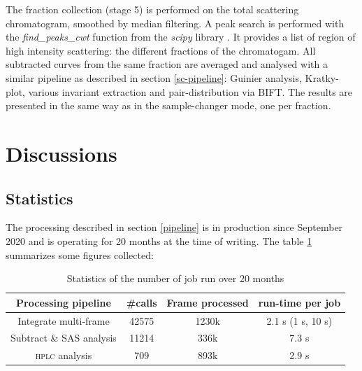 \documentclass[preprint]{iucr}              %
\begin{document}
The fraction collection (stage 5) is performed on the total scattering chromatogram, smoothed by median filtering. 
A peak search is performed with the \textit{find\_peaks\_cwt} function from the \textit{scipy} library \cite{scipy}.
It provides a list of region of high intensity scattering: the different fractions of the chromatogam.
All subtracted curves from the same fraction are averaged and analysed with a similar pipeline as described in section \ref{sc-pipeline}: Guinier analysis, Kratky-plot, various invariant extraction and pair-distribution via BIFT.
The results are presented in the same way as in the sample-changer mode, one per fraction.

\section{Discussions}

\subsection{Statistics}
The processing described in section \ref{pipeline} is in production since September 2020 and is operating for 20 months at the time of writing.
The table \ref{stats} summarizes some figures collected:
\begin{table}
    \label{stats}
    \caption{Statistics of the number of job run over 20 months}
    \begin{center}
    \begin{tabular}{|c|c|c|c|}
        \hline
        Processing pipeline & \#calls & Frame processed & run-time per job \\
        \hline
        Integrate multi-frame & 42575 & 1230k & 2.1 s (1 s, 10 s) \\
        Subtract \& SAS analysis & 11214 & 336k & 7.3 s \\
        \textsc{hplc} analysis & 709 & 893k & 2.9 s \\
        \hline
    \end{tabular}
    
    \end{center}
\end{table}
\end{document}
